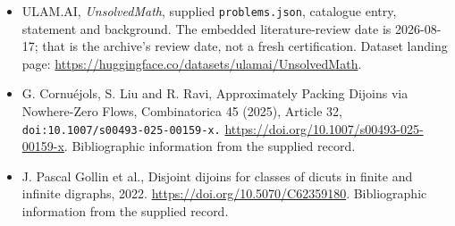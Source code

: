 \documentclass[11pt,a4paper]{article}
\begin{document}
{\small

\begin{itemize}

\item[\hypertarget{source:statement:1}{S1}] ULAM.AI, \emph{UnsolvedMath}, supplied \texttt{problems.json}, catalogue entry, statement and background. The embedded literature-review date is 2026-08-17; that is the archive’s review date, not a fresh certification. Dataset landing page: \url{https://huggingface.co/datasets/ulamai/UnsolvedMath}.

\item[\hypertarget{source:statement:2}{S2}] G. Cornuéjols, S. Liu and R. Ravi, Approximately Packing Dijoins via Nowhere-Zero Flows, Combinatorica 45 (2025), Article 32, \nolinkurl{doi:10.1007/s00493-025-00159-x.} \url{https://doi.org/10.1007/s00493-025-00159-x}. Bibliographic information from the supplied record.

\item[\hypertarget{source:statement:3}{S3}] J. Pascal Gollin et al., Disjoint dijoins for classes of dicuts in finite and infinite digraphs, 2022. \url{https://doi.org/10.5070/C62359180}. Bibliographic information from the supplied record.

\end{itemize}

}

\label{end:statement}
\end{document}
